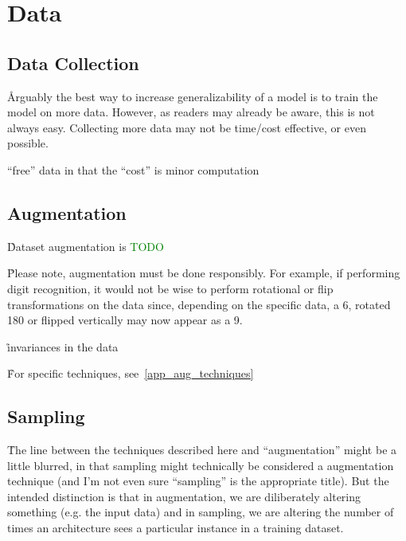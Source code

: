 \section{Data}

\subsection{Data Collection}

\r{Arguably the best way to increase generalizability of a model is to train the model on more data. However, as readers may already be aware, this is not always easy. Collecting more data may not be time/cost effective, or even possible.}

\r{``free'' data in that the ``cost'' is minor computation}

\subsection{Augmentation}

\r{Dataset augmentation is \textcolor{green}{TODO}}

\r{Please note, augmentation must be done responsibly. For example, if performing digit recognition, it would not be wise to perform rotational or flip transformations on the data since, depending on the specific data, a 6, rotated 180 or flipped vertically may now appear as a 9.}


\r{invariances in the data}

\r{For specific techniques, see~\ref{app_aug_techniques}}



\subsection{Sampling}

\r{The line between the techniques described here and ``augmentation'' might be a little blurred, in that sampling might technically be considered a augmentation technique (and I'm not even sure ``sampling'' is the appropriate title). But the intended distinction is that in augmentation, we are diliberately altering something (e.g. the input data) and in sampling, we are altering the number of times an architecture sees a particular instance in a training dataset.}



